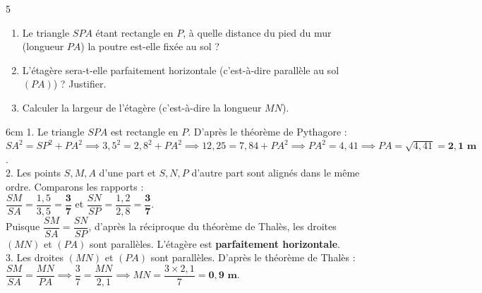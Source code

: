 \documentclass[a4paper]{book}
\begin{document}
{    
    \begin{exerciceNote}{5}
        \begin{enumerate}
            \item Le triangle $SPA$ étant rectangle en $P$, à quelle distance du pied du mur (longueur $PA$) la poutre est-elle fixée au sol ?
            \item L'étagère sera-t-elle parfaitement horizontale (c'est-à-dire parallèle au sol $(PA)$) ? Justifier.
            \item Calculer la largeur de l'étagère (c'est-à-dire la longueur $MN$).
        \end{enumerate}
        \begin{ZoneReponse}{6cm}
        1. Le triangle $SPA$ est rectangle en $P$. D'après le théorème de Pythagore : \\
        \phantom{1. }$SA^2 = SP^2 + PA^2 \implies 3,5^2 = 2,8^2 + PA^2 \implies 12,25 = 7,84 + PA^2 \implies PA^2 = 4,41 \implies PA = \sqrt{4,41} = \mathbf{2,1\text{ m}}$. \\
        2. Les points $S,M,A$ d'une part et $S,N,P$ d'autre part sont alignés dans le même ordre. Comparons les rapports : \\
        \phantom{2. }$\dfrac{SM}{SA} = \dfrac{1,5}{3,5} = \mathbf{\dfrac{3}{7}}$ \quad et \quad $\dfrac{SN}{SP} = \dfrac{1,2}{2,8} = \mathbf{\dfrac{3}{7}}$. \\
        \phantom{2. }Puisque $\dfrac{SM}{SA} = \dfrac{SN}{SP}$, d'après la réciproque du théorème de Thalès, les droites $(MN)$ et $(PA)$ sont parallèles. L'étagère est \textbf{parfaitement horizontale}. \\
        3. Les droites $(MN)$ et $(PA)$ sont parallèles. D'après le théorème de Thalès : $\dfrac{SM}{SA} = \dfrac{MN}{PA} \implies \dfrac{3}{7} = \dfrac{MN}{2,1} \implies MN = \dfrac{3 \times 2,1}{7} = \mathbf{0,9\text{ m}}$.
        \end{ZoneReponse}
    \end{exerciceNote}


   
}
\end{document}

